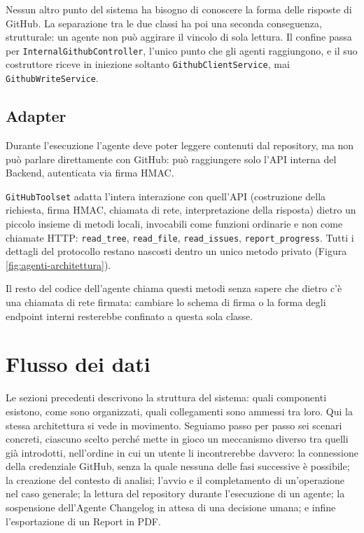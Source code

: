 \documentclass[12pt, a4paper]{article}
\begin{document}
Nessun altro punto del sistema ha bisogno di conoscere la forma delle risposte di GitHub. La separazione tra le due classi ha poi una seconda conseguenza, strutturale: un agente non può aggirare il vincolo di sola lettura. Il confine passa per \texttt{InternalGithubController}, l'unico punto che gli agenti raggiungono, e il suo costruttore riceve in iniezione soltanto \texttt{GithubClientService}, mai \texttt{GithubWriteService}.


\subsection{Adapter}

Durante l'esecuzione l'agente deve poter leggere contenuti dal repository, ma non può parlare direttamente con GitHub: può raggiungere solo l'API interna del Backend, autenticata via firma HMAC.

\texttt{GitHubToolset} adatta l'intera interazione con quell'API (costruzione della richiesta, firma HMAC, chiamata di rete, interpretazione della risposta) dietro un piccolo insieme di metodi locali, invocabili come funzioni ordinarie e non come chiamate HTTP: \texttt{read\_tree}, \texttt{read\_file}, \texttt{read\_issues}, \texttt{report\_progress}. Tutti i dettagli del protocollo restano nascosti dentro un unico metodo privato (Figura \ref{fig:agenti-architettura}).

Il resto del codice dell'agente chiama questi metodi senza sapere che dietro c'è una chiamata di rete firmata: cambiare lo schema di firma o la forma degli endpoint interni resterebbe confinato a questa sola classe.

\newpage
\section{Flusso dei dati}

Le sezioni precedenti descrivono la struttura del sistema: quali componenti esistono, come sono organizzati, quali collegamenti sono ammessi tra loro. Qui la stessa architettura si vede in movimento. Seguiamo passo per passo sei scenari concreti, ciascuno scelto perché mette in gioco un meccanismo diverso tra quelli già introdotti, nell'ordine in cui un utente li incontrerebbe davvero: la connessione della credenziale GitHub, senza la quale nessuna delle fasi successive è possibile; la creazione del contesto di analisi; l'avvio e il completamento di un'operazione nel caso generale; la lettura del repository durante l'esecuzione di un agente; la sospensione dell'Agente Changelog in attesa di una decisione umana; e infine l'esportazione di un Report in PDF.
\end{document}
